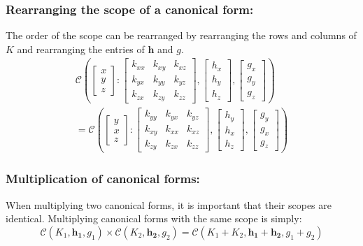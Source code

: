 \documentclass[12pt,oneside,openany,a4paper, %
afrikaans,english,
]{memoir}
\numberwithin{equation}{chapter}
\begin{document}
\subsubsection{Rearranging the scope of a canonical form:}
The order of the scope can be rearranged by rearranging the rows and columns of $K$  and rearranging the entries of $\bm{h}$ and $g$.
\begin{multline}
\mathcal{C}\left(
\begin{bmatrix}
x\\
y\\
z
\end{bmatrix}:
\begin{bmatrix}
k_{xx} & k_{xy} & k_{xz}\\
k_{yx} & k_{yy} & k_{yz}\\
k_{zx} & k_{zy} & k_{zz}
\end{bmatrix},
\begin{bmatrix}
h_x\\
h_y\\
h_z
\end{bmatrix},
\begin{bmatrix}
g_x\\
g_y\\
g_z
\end{bmatrix}
\right)
\\=
\mathcal{C}\left(
\begin{bmatrix}
y\\
x\\
z
\end{bmatrix}:
\begin{bmatrix}
k_{yy} & k_{yx} & k_{yz}\\
k_{xy} & k_{xx} & k_{xz}\\
k_{zy} & k_{zx} & k_{zz}
\end{bmatrix},
\begin{bmatrix}
h_y\\
h_x\\
h_z
\end{bmatrix},
\begin{bmatrix}
g_y\\
g_x\\
g_z
\end{bmatrix}
\right)
\end{multline}
\subsubsection{Multiplication of canonical forms:}
When multiplying two canonical forms, it is important that their scopes are identical. Multiplying canonical forms with the same scope is simply:
\begin{equation}\label{eq:10}
\mathcal{C}(K_1,\bm{h_1},g_1)\times\mathcal{C}(K_2,\bm{h_2},g_2) = \mathcal{C}(K_1 + K_2,\bm{h_1} + \bm{h_2},g_1 + g_2)
\end{equation}
\end{document}
